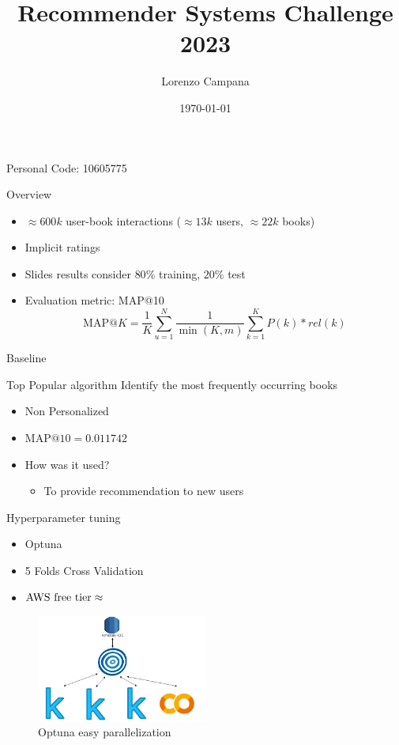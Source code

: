 \documentclass{beamer}
\title{Recommender Systems Challenge 2023}
\author{Lorenzo Campana}
\institute{Politecnico di Milano}
\date{\today}
\begin{document}
\begin{frame}
  \titlepage\center Personal Code: 10605775
\end{frame}

\begin{frame}{Overview}
  \begin{itemize}
    \item $\approx 600k$ user-book interactions ($\approx 13k$ users, $\approx 22k$ books)
    \item Implicit ratings
    \item Slides results consider $80\%$ training, $20\%$ test
    \item Evaluation metric: MAP@10 
      \[
      \text{MAP@}K = \frac{1}{K} \sum_{u=1}^{N} \frac{1}{\min(K, m)} \sum_{k=1}^{K} P(k) * rel(k)
      \]
  \end{itemize}
\end{frame}

\begin{frame}{Baseline}
  \begin{block}{Top Popular algorithm}
    Identify the most frequently occurring books
  \end{block}
  \begin{itemize}
    \item Non Personalized
    \item $\text{MAP@}10=0.011742$
    \item How was it used?
    \begin{itemize}
      \item To provide recommendation to new users
    \end{itemize}
  \end{itemize}
\end{frame}

\begin{frame}{Hyperparameter tuning}
  \begin{itemize}
    \item Optuna
    \item 5 Folds Cross Validation
    \item $\text{\text{AWS free tier}} \approx $ 
  \end{itemize}
  \begin{figure}
    \vspace{1cm}
    \centering
    \includegraphics[width=0.5\textwidth]{diagram_aws_optuna_1.png}
    \caption{Optuna easy parallelization}
  \end{figure}
  
\end{frame}
\end{document}
